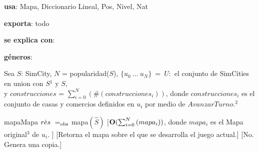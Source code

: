 \begin{Interfaz}

    \textbf{usa}: Mapa, Diccionario Lineal, Pos, Nivel, Nat 
    
    \textbf{exporta}: todo

    \textbf{se explica con}: 
  
    \textbf{géneros}: 
    
    
    Sea $S$: SimCity, $N$ = popularidad($S$), $\{u_0\ ...\ u_{N}\}\ =\ U:$ el conjunto de SimCities en union con $S$$^{1}$ y $S$, \\
    y $construcciones$ = $\sum_{i = 0}^{N}{}(\#(construcciones_i))$, donde $construcciones_i$
    es el conjunto de casas y comercios definidos en $u_i$ por medio de $AvanzarTurno$.$^{2}$ 

    \InterfazFuncion
    {mapa}{}{Mapa}
    {$\hat{res}\ \igobs\ $mapa$(\hat{S})$}
    [$\bold{O}(\sum_{i = 0}^{N}{}(mapa_i))$,
        donde $mapa_i$ es el Mapa original$^{3}$ de $u_i$.
    ]
    [Retorna el mapa sobre el que se desarrolla el juego actual.]
    [No. Genera una copia.]


\end{Interfaz}

